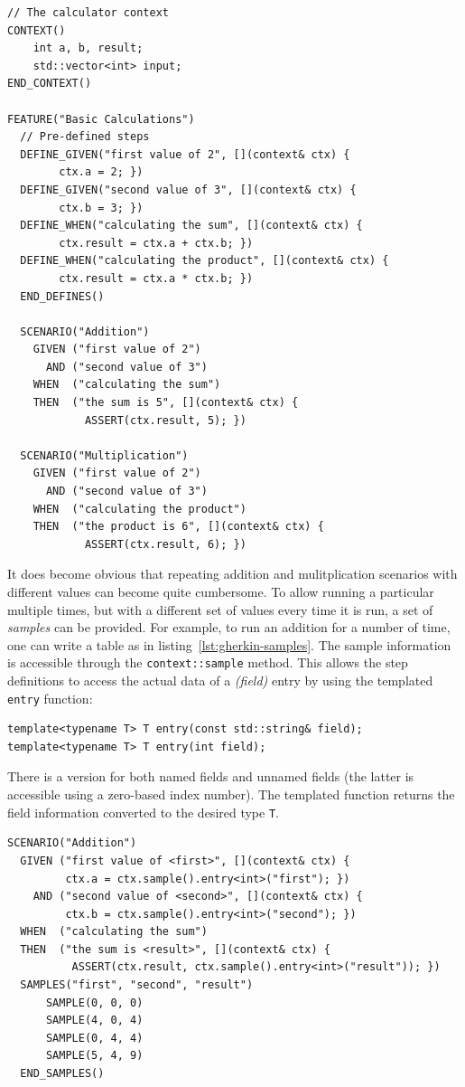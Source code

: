 \documentclass[10pt,a4paper,openany]{mudbook}
\makeatletter
\newcommand{\indextt}[2][]{\texttt{#2}\index{#2@\texttt{#2}#1}}
\makeatother
\begin{document}
\begin{lstlisting}[style=snippet,
  caption={Gherkin test example},
  label=lst:gherkin]
// The calculator context
CONTEXT()
    int a, b, result;
    std::vector<int> input;
END_CONTEXT()

FEATURE("Basic Calculations")
  // Pre-defined steps
  DEFINE_GIVEN("first value of 2", [](context& ctx) {
        ctx.a = 2; })
  DEFINE_GIVEN("second value of 3", [](context& ctx) {
        ctx.b = 3; })
  DEFINE_WHEN("calculating the sum", [](context& ctx) { 
        ctx.result = ctx.a + ctx.b; })
  DEFINE_WHEN("calculating the product", [](context& ctx) { 
        ctx.result = ctx.a * ctx.b; })
  END_DEFINES()

  SCENARIO("Addition")
    GIVEN ("first value of 2")
      AND ("second value of 3")
    WHEN  ("calculating the sum")
    THEN  ("the sum is 5", [](context& ctx) {
            ASSERT(ctx.result, 5); })

  SCENARIO("Multiplication")
    GIVEN ("first value of 2")
      AND ("second value of 3")
    WHEN  ("calculating the product")
    THEN  ("the product is 6", [](context& ctx) {
            ASSERT(ctx.result, 6); })
\end{lstlisting}

It does become obvious that repeating addition and mulitplication scenarios
with different values can become quite cumbersome. To allow running a
particular multiple times, but with a different set of values every time it
is run, a set of \textit{samples} can be provided. For example, to run
an addition for a number of time, one can write a table as in
listing~\ref{lst:gherkin-samples}. The sample information is accessible through
the \texttt{context::sample} method. This allows the step definitions to access
the actual data of a \textit{(field)} entry by using the templated
\indextt{entry} function:

\begin{lstlisting}[style=definition]
template<typename T> T entry(const std::string& field);
template<typename T> T entry(int field);
\end{lstlisting}

\noindent
There is a version for both named fields and unnamed fields (the latter
is accessible using a zero-based index number). The templated function returns
the field information converted to the desired type \texttt{T}.
 
\begin{lstlisting}[style=snippet,
  caption={Gherkin test example},
  label=lst:gherkin-samples]
SCENARIO("Addition")
  GIVEN ("first value of <first>", [](context& ctx) {
         ctx.a = ctx.sample().entry<int>("first"); })
    AND ("second value of <second>", [](context& ctx) {
         ctx.b = ctx.sample().entry<int>("second"); })
  WHEN  ("calculating the sum")
  THEN  ("the sum is <result>", [](context& ctx) {
          ASSERT(ctx.result, ctx.sample().entry<int>("result")); })
  SAMPLES("first", "second", "result")
      SAMPLE(0, 0, 0)
      SAMPLE(4, 0, 4)
      SAMPLE(0, 4, 4)
      SAMPLE(5, 4, 9)
  END_SAMPLES()
\end{lstlisting}
\end{document}
